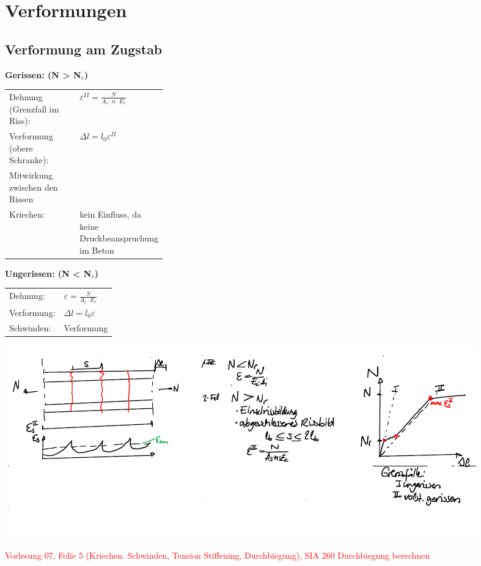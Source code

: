 \section{Verformungen}



	\begin{minipage}{0.5\linewidth}

		\subsection{Verformung am Zugstab}
		
			
	\textbf{Gerissen: (N > N$_r$) }
	
	\begin{tabular}{lp{0.3\linewidth}}
		
		Dehnung (Grenzfall im Riss):		& $ \varepsilon^{II} =  \frac{N}{A_s \cdot n \cdot E_c} $ \\
		
		Verformung (obere Schranke):		& $ \Delta l = l_0 \varepsilon^{II} $ \\
		
		Mitwirkung zwischen den Rissen	& \\
		
		Kriechen:						& kein Einfluss, da keine Druckbeanspruchung im Beton \\
		
	\end{tabular}
	
\end{minipage}
\begin{minipage}{0.5\linewidth}
		
		
		\textbf{Ungerissen: (N < N$_r$) }
		
		\begin{tabular}{ll}
			Dehnung:		& $ \varepsilon = \frac{N}{A_i \cdot E_c} $ \\
			
			Verformung:		& $ \Delta l = l_0 \varepsilon $ \\
			
			Schwinden:		& Verformung \\
			
		\end{tabular}
				\includegraphics[width=\linewidth]{images/Verformung1Zustand.PNG}
	\end{minipage}



\textcolor{red}{Vorlesung 07, Folie 5 (Kriechen. Schwinden, Tension Stiffening, Durchbiegung), SIA 260 Durchbiegung berechnen}